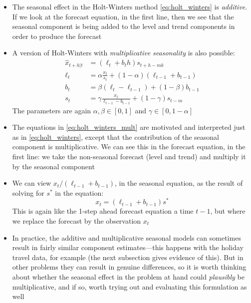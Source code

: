 \documentclass{article}
\begin{document}
\begin{itemize}
\item The seasonal effect in the Holt-Winters method \eqref{eq:holt_winters} is
  \emph{additive}. If we look at the forecast equation, in the first line, then
  we see that the seasonal component is being added to the level and trend  
  components in order to produce the forecast 

\item A version of Holt-Winters with \emph{multiplicative seasonality} is also 
  possible: 
  \begin{equation}
  \label{eq:holt_winters_mult}
  \begin{aligned}
  \hat{x}_{t+h | t} &= (\ell_t + b_t h) s_{t+h-mk} \\   
  \ell_t &= \alpha \frac{x_t}{s_t} + (1-\alpha) (\ell_{t-1} + b_{t-1}) \\ 
  b_t &= \beta (\ell_t - \ell_{t-1}) + (1-\beta) b_{t-1} \\
  s_t &= \gamma \frac{x_t}{\ell_{t-1} - b_{t-1}} + (1-\gamma) s_{t-m} 
  \end{aligned}
  \end{equation}
  The parameters are again $\alpha, \beta \in [0,1]$ and $\gamma \in [0,
  1-\alpha]$  

\item The equations in \eqref{eq:holt_winters_mult} are motivated and
  interpreted just as in \eqref{eq:holt_winters}, except that the contribution 
  of the seasonal component is multiplicative. We can see this in the forecast
  equation, in the first line: we take the non-seasonal forecast (level and
  trend) and multiply it by the seasonal component  

\item We can view $x_t / (\ell_{t-1} +  b_{t-1})$, in the seasonal equation, as
  the result of solving for $s^*$ in the equation: 
  \[
  x_t = (\ell_{t-1} + b_{t-1}) s^*
  \]
  This is again like the 1-step ahead forecast equation a time $t-1$, but where
  we replace the forecast  by the observation $x_t$

\item In practice, the additive and multiplicative seasonal models can sometimes
  result in fairly similar component estimates---this happens with the holiday
  travel data, for example (the next subsection gives evidence of this). But in
  other problems they can result in genuine differences, so it is worth thinking
  about whether the seasonal effect in the problem at hand could
  \emph{plausibly} be multiplicative, and if so, worth trying out and evaluating
  this formulation as well 
\end{itemize}
\end{document}
